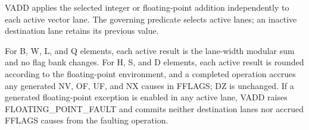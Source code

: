 VADD applies the selected integer or floating-point addition independently to
each active vector lane. The governing predicate selects active lanes; an
inactive destination lane retains its previous value.

For B, W, L, and Q elements, each active result is the lane-width modular sum
and no flag bank changes. For H, S, and D elements, each active result is
rounded according to the floating-point environment, and a completed operation
accrues any generated NV, OF, UF, and NX causes in FFLAGS; DZ is unchanged.
If a generated floating-point exception is enabled in any active lane, VADD
raises FLOATING\_POINT\_FAULT and commits neither destination lanes nor accrued
FFLAGS causes from the faulting operation.
